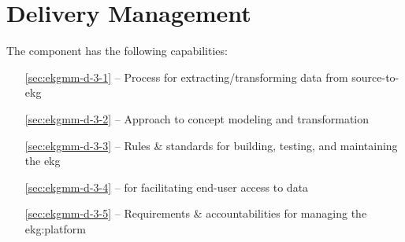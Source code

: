 \chapter{ Delivery Management}\label{ch:ekgmm-d-3}

The  component has the following capabilities:

\begin{itemize}[leftmargin=.5in]
  \item [\ref{sec:ekgmm-d-3-1}]  -- Process for extracting/transforming data from source-to-\gls{ekg}
  \item [\ref{sec:ekgmm-d-3-2}]  -- Approach to concept modeling and transformation
  \item [\ref{sec:ekgmm-d-3-3}]  -- Rules \& standards for building, testing, and maintaining the \gls{ekg}
  \item [\ref{sec:ekgmm-d-3-4}]  --  for facilitating end-user access to data
  \item [\ref{sec:ekgmm-d-3-5}]  -- Requirements \& accountabilities for managing the \gls{ekg:platform}
\end{itemize}







